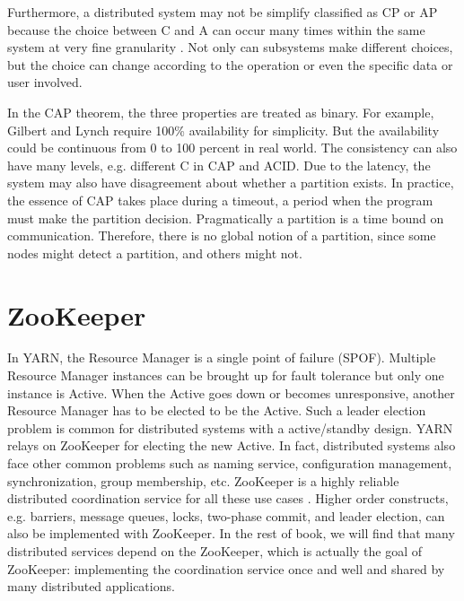 \documentclass[11pt]{book}
\begin{document}
Furthermore, a distributed system may not be simplify classified as CP or AP because the choice between C and A can occur many times within the same system at very fine granularity \cite{Brewer:2012}. Not only can subsystems make different choices, but the choice can change according to the operation or even the specific data or user involved.

In the CAP theorem, the three properties are treated as binary. For example, Gilbert and Lynch require 100\% availability for simplicity. But the availability could be continuous from 0 to 100 percent in real world. The consistency can also have many levels, e.g. different C in CAP and ACID. Due to the latency, the system may also have disagreement about whether a partition exists. In practice, the essence of CAP takes place during a timeout, a period when the program must make the partition decision. Pragmatically a partition is a time bound on communication. Therefore, there is no global notion of a partition, since some nodes might detect a partition, and others might not.


\section[ZooKeeper]
{ZooKeeper}
In YARN, the Resource Manager is a single point of failure (SPOF). Multiple Resource Manager instances can be brought up for fault tolerance but only one instance is Active. 
When the Active goes down or becomes unresponsive, another Resource Manager has to be elected to be the Active. Such a leader election problem is common for distributed systems with a active/standby design. YARN relays on ZooKeeper for electing the new Active. In fact, distributed systems also face other common problems such as naming service, configuration management, synchronization, group membership, etc. ZooKeeper is a highly reliable distributed coordination service for all these use cases \cite{ZooKeeper}. Higher order constructs, e.g. barriers, message queues, locks, two-phase commit, and leader election, can also be implemented with ZooKeeper. In the rest of book, we will find that many distributed services depend on the ZooKeeper, which is actually the goal of ZooKeeper: implementing the coordination service once and well and shared by many distributed applications.
\end{document}
